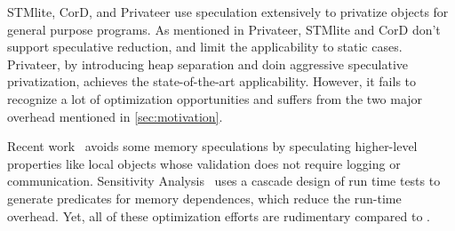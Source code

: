 STMlite, CorD, and Privateer use speculation extensively to privatize
objects for general purpose programs. As mentioned in Privateer, STMlite
and CorD don't support speculative reduction, and limit the applicability
to static cases. Privateer, by introducing heap separation and doin
aggressive speculative privatization, achieves the state-of-the-art
applicability. However, it fails to recognize a lot of optimization
opportunities and suffers from the two major overhead mentioned in
\ref{sec:motivation}.

Recent work~\cite{ctian:2008:micro,johnson:12:pldi,kim:12:cgo} avoids some
memory speculations by speculating higher-level properties like local
objects whose validation does not require logging or communication.
Sensitivity Analysis~\cite{Rus:07:ics} uses a cascade design of run time
tests to generate predicates for memory dependences, which reduce the
run-time overhead. Yet, all of these optimization efforts are rudimentary
compared to \namensp.













